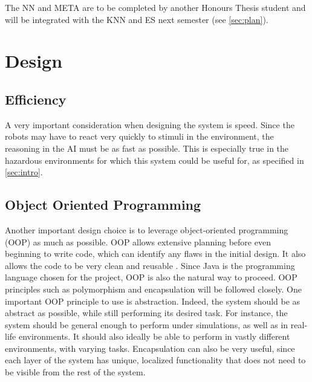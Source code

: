 \documentclass[titlepage,11pt]{article}
\begin{document}
The NN and META are to be completed by another Honours Thesis student and will be integrated with the KNN and ES next semester (see \autoref{sec:plan}).

\section{Design}
\label{sec:design}

\subsection{Efficiency}

A very important consideration when designing the system is speed. Since the robots may have to react very quickly to stimuli in the environment, the reasoning in the AI must be as fast as possible. This is especially true in the hazardous environments for which this system could be useful for, as specified in \autoref{sec:intro}.

\subsection{Object Oriented Programming}

Another important design choice is to leverage object-oriented programming (OOP) as much as possible. OOP allows extensive planning before even beginning to write code, which can identify any flaws in the initial design. It also allows the code to be very clean and reusable \cite{oop}. Since Java is the programming language chosen for the project, OOP is also the natural way to proceed.  OOP principles such as polymorphism and encapsulation will be followed closely. One important OOP principle to use is abstraction. Indeed, the system should be as abstract as possible, while still performing its desired task. For instance, the system should be general enough to perform under simulations, as well as in real-life environments. It should also ideally be able to perform in vastly different environments, with varying tasks. Encapsulation can also be very useful, since each layer of the system has unique, localized functionality that does not need to be visible from the rest of the system.
\end{document}
